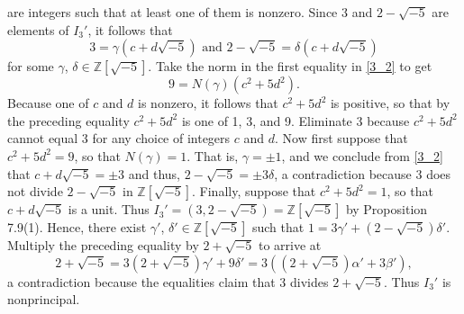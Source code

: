 \documentclass[9pt]{article}
\newcommand{\Z}{\mathbb{Z}}
\begin{document}
\begin{enumerate}
\begin{enumerate}
               are integers such that at least one of them is nonzero. Since
               3 and $2 - \sqrt{-5}$ are elements of $I_3'$, it follows that
               \begin{equation} \label{3_2}
                  3 = \gamma(c + d\sqrt{-5}) \text{ and }
                  2 - \sqrt{-5} = \delta(c + d\sqrt{-5})
               \end{equation}
               for some $\gamma$, $\delta \in \Z[\sqrt{-5}]$. Take the norm in
               the first equality in \eqref{3_2} to get
               $$9 = N(\gamma)(c^2 + 5d^2).$$
               Because one of $c$ and $d$ is nonzero, it follows that
               $c^2 + 5d^2$ is positive, so that by the preceding equality
               $c^2 + 5d^2$ is one of 1, 3, and 9. Eliminate 3 because
               $c^2 + 5d^2$ cannot equal 3 for any choice of integers $c$ and
               $d$. Now first suppose that $c^2 + 5d^2 = 9$, so that
               $N(\gamma) = 1$. That is, $\gamma = \pm1$, and we conclude from
               \eqref{3_2} that $c + d\sqrt{-5} = \pm3$ and thus,
               $2 - \sqrt{-5} = \pm3\delta$, a contradiction because 3 does not
               divide $2 - \sqrt{-5}$ in $\Z[\sqrt{-5}]$. Finally, suppose that
               $c^2 + 5d^2 = 1$, so that $c + d\sqrt{-5}$ is a unit. Thus
               $I_3' = (3, 2 - \sqrt{-5}) = \Z[\sqrt{-5}]$ by Proposition
               7.9(1). Hence, there exist $\gamma'$,
               $\delta' \in \Z[\sqrt{-5}]$ such that
               $1 = 3\gamma' + (2 - \sqrt{-5})\delta'$. Multiply the
               preceding equality by $2 + \sqrt{-5}$ to arrive at
               $$2 + \sqrt{-5} = 3(2 + \sqrt{-5})\gamma' + 9\delta' =
                 3((2 + \sqrt{-5})\alpha' + 3\beta'),$$
               a contradiction because the equalities claim that 3 divides
               $2 + \sqrt{-5}$. Thus $I_3'$ is nonprincipal.
      \end{enumerate}
\end{enumerate}
\end{document}
